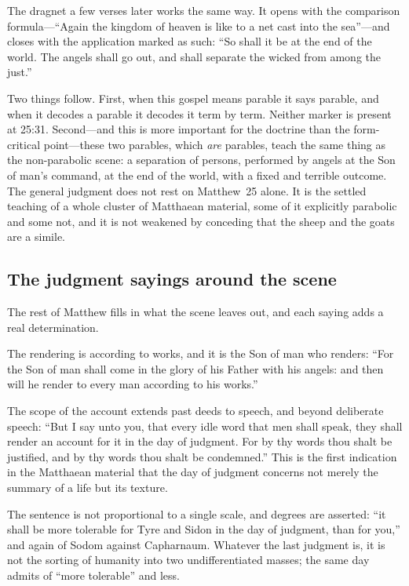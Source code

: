 The dragnet a few verses later works the same way. It opens with the comparison formula---``Again the kingdom of heaven is like to a net cast into the sea''---and closes with the application marked as such: ``So shall it be at the end of the world. The angels shall go out, and shall separate the wicked from among the just.''

Two things follow. First, when this gospel means parable it says parable, and when it decodes a parable it decodes it term by term. Neither marker is present at 25:31. Second---and this is more important for the doctrine than the form-critical point---these two parables, which \emph{are} parables, teach the same thing as the non-parabolic scene: a separation of persons, performed by angels at the Son of man's command, at the end of the world, with a fixed and terrible outcome. The general judgment does not rest on Matthew~25 alone. It is the settled teaching of a whole cluster of Matthaean material, some of it explicitly parabolic and some not, and it is not weakened by conceding that the sheep and the goats are a simile.

\subsection{The judgment sayings around the scene}

The rest of Matthew fills in what the scene leaves out, and each saying adds a real determination.

The rendering is according to works, and it is the Son of man who renders: ``For the Son of man shall come in the glory of his Father with his angels: and then will he render to every man according to his works.''

The scope of the account extends past deeds to speech, and beyond deliberate speech: ``But I say unto you, that every idle word that men shall speak, they shall render an account for it in the day of judgment. For by thy words thou shalt be justified, and by thy words thou shalt be condemned.'' This is the first indication in the Matthaean material that the day of judgment concerns not merely the summary of a life but its texture.

The sentence is not proportional to a single scale, and degrees are asserted: ``it shall be more tolerable for Tyre and Sidon in the day of judgment, than for you,'' and again of Sodom against Capharnaum. Whatever the last judgment is, it is not the sorting of humanity into two undifferentiated masses; the same day admits of ``more tolerable'' and less.

